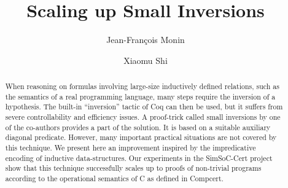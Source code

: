\documentclass{llncs}
\begin{document}
\title{Scaling up Small Inversions
}
\author{Jean-Fran\c{c}ois Monin
\and 
Xiaomu Shi
}

\maketitle

\begin{abstract}
  When reasoning on formulas involving large-size inductively defined
  relations, such as the semantics of a real programming language,
  many steps require the inversion of a hypothesis. The built-in
  ``inversion'' tactic of Coq can then be used, but it suffers from
  severe controllability and efficiency issues.  A proof-trick called
  small inversions by one of the co-authors provides a part of the
  solution. It is based on a suitable auxiliary diagonal
  predicate. However, many important practical situations are not
  covered by this technique.  We present here an improvement inspired
  by the impredicative encoding of inductive data-structures. Our
  experiments in the SimSoC-Cert project show that this technique
  successfully scales up to proofs of non-trivial programs according
  to the operational semantics of C as defined in Compcert.
\end{abstract}












\end{document}
